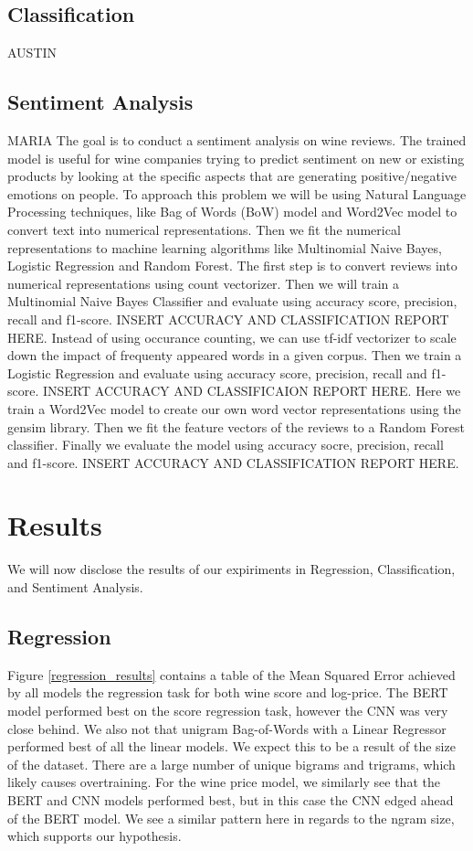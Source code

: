 \documentclass[10pt]{IEEEtran}
\begin{document}
\subsection{Classification}
AUSTIN

\subsection{Sentiment Analysis}
    MARIA
    The goal is to conduct a sentiment analysis on wine reviews. The trained model is useful for wine companies trying to predict sentiment on new or existing products by looking at the specific aspects that are generating positive/negative emotions on people.   
    To approach this problem we will be using Natural Language Processing techniques, like Bag of Words (BoW) model and Word2Vec model to convert text into numerical representations. Then we fit the numerical representations to machine learning algorithms like Multinomial Naive Bayes, Logistic Regression and Random Forest. 
    The first step is to convert reviews into numerical representations using count vectorizer. Then we will train a Multinomial Naive Bayes Classifier and evaluate using accuracy score, precision, recall and f1-score. 
    INSERT ACCURACY AND CLASSIFICATION REPORT HERE.
    Instead of using occurance counting, we can use tf-idf vectorizer to scale down the impact of frequenty appeared words in a given corpus. Then we train a Logistic Regression and evaluate using accuracy score, precision, recall and f1-score. 
    INSERT ACCURACY AND CLASSIFICAION REPORT HERE. 
    Here we train a Word2Vec model to create our own word vector representations using the gensim library. Then we fit the feature vectors of the reviews to a Random Forest classifier. Finally we evaluate the model using accuracy socre, precision, recall and f1-score. 
    INSERT ACCURACY AND CLASSIFICATION REPORT HERE. 

\section{Results}
    We will now disclose the results of our expiriments in Regression, Classification, and Sentiment Analysis.

\subsection{Regression}
    Figure \ref{regression_results} contains a table of the Mean Squared Error achieved by all models the regression task for both wine score and log-price. The BERT model performed best on the score regression task, however the CNN was very close behind. We also not that unigram Bag-of-Words with a Linear Regressor performed best of all the linear models. We expect this to be a result of the size of the dataset. There are a large number of unique bigrams and trigrams, which likely causes overtraining. For the wine price model, we similarly see that the BERT and CNN models performed best, but in this case the CNN edged ahead of the BERT model. We see a similar pattern here in regards to the ngram size, which supports our hypothesis.
\end{document}
